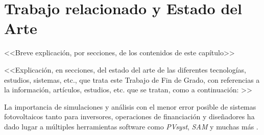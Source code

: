 \chapter{Trabajo relacionado y Estado del Arte} \label{chp:state-of-the-art}

<<Breve explicación, por secciones, de los contenidos de este capítulo>>


<<Explicación, en secciones, del estado del arte de las diferentes tecnologías, estudios, sistemas, etc., que trata este Trabajo de Fin de Grado, con referencias a la información, artículos, estudios, etc. que se tratan, como a continuación: \cite{stein_models_2009}>>

La importancia de simulaciones y análisis con el menor error posible de sistemas fotovoltaicos tanto para inversores, operaciones de financiación y diseñadores ha dado lugar a múltiples herramientas software como \textit{PVsyst}, \textit{SAM} y muchas más \cite{stein_models_2009}.

